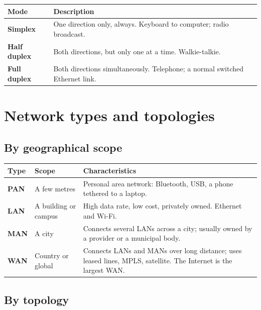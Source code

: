 \documentclass[11pt,a4paper]{article}
\begin{document}
\begin{center}\small
\begin{tabularx}{\textwidth}{>{\bfseries}p{} X}
\toprule Mode & Description\\
\midrule
Simplex & One direction only, always. Keyboard to computer; radio broadcast.\\
Half duplex & Both directions, but only one at a time. Walkie-talkie.\\
Full duplex & Both directions simultaneously. Telephone; a normal switched Ethernet link.\\
\bottomrule
\end{tabularx}
\end{center}

\section{Network types and topologies}

\subsection{By geographical scope}

\begin{center}\small
\begin{tabularx}{\textwidth}{>{\bfseries}p{} p{} X}
\toprule Type & Scope & Characteristics\\
\midrule
PAN & A few metres & Personal area network: Bluetooth, USB, a phone tethered to a laptop.\\
LAN & A building or campus & High data rate, low cost, privately owned. Ethernet and Wi-Fi.\\
MAN & A city & Connects several LANs across a city; usually owned by a provider or a municipal body.\\
WAN & Country or global & Connects LANs and MANs over long distance; uses leased lines, MPLS, satellite. The Internet is the largest WAN.\\
\bottomrule
\end{tabularx}
\end{center}

\subsection{By topology}
\end{document}

